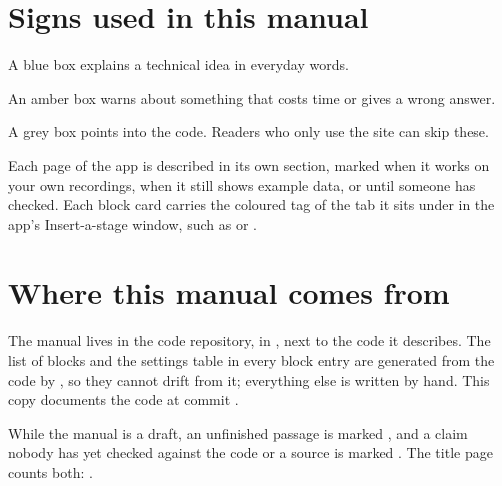 \section*{Signs used in this manual}
\begin{plainterms}
A blue box explains a technical idea in everyday words.
\end{plainterms}
\begin{watchout}
An amber box warns about something that costs time or gives a wrong answer.
\end{watchout}
\begin{underthehood}
A grey box points into the code. Readers who only use the site can skip these.
\end{underthehood}

Each page of the app is described in its own section, marked  when it works
on your own recordings,  when it still shows example data, or
 until someone has checked. Each block card carries the coloured tag of
the tab it sits under in the app's Insert-a-stage window, such as  or
.

\section*{Where this manual comes from}
The manual lives in the code repository, in , next to the code it
describes. The list of blocks and the settings table in every block entry are generated from
the code by , so they cannot drift from it; everything else is
written by hand. This copy documents the code at commit \texttt{\ubversion}.

While the manual is a draft, an unfinished passage is marked
, and a claim nobody has yet checked against the code or a source
is marked . The title page counts both: \ubwritingstatus.
